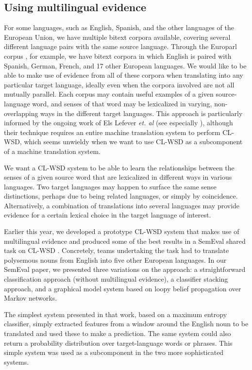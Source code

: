\subsection{Using multilingual evidence}
For some languages, such as English, Spanish, and the other languages of the
European Union, we have multiple bitext corpora available, covering several
different language pairs with the same source language. Through the Europarl
corpus \cite{europarl}, for example, we have bitext corpora in which English is
paired with Spanish, German, French, and 17 other European languages.
We would like to be able to make use of evidence from all of these corpora when
translating into any particular target language, ideally even when the corpora
involved are not all mutually parallel.
Each corpus may contain useful examples of a given source-language word,
and senses of that word may be lexicalized in varying, non-overlapping ways in
the different target languages.
This approach is particularly informed by the ongoing work of Els Lefever
\emph{et. al} (see especially \cite{lefever-hoste-decock:2011:ACL-HLT2011}),
although their technique requires an entire machine translation system to
perform CL-WSD, which seems unwieldy when we want to use CL-WSD as a
subcomponent of a machine translation system.

We want a CL-WSD system to be able to learn the relationships between the
senses of a given source word that are lexicalized in different ways in various
languages.
Two target languages may happen to surface the same sense distinctions, perhaps
due to being related languages, or simply by coincidence.
Alternatively, a combination of translations into several languages may provide
evidence for a certain lexical choice in the target language of interest.

Earlier this year, we developed a prototype CL-WSD system that makes use of
multilingual evidence \cite{rudnick-liu-gasser:2013:SemEval-2013} and produced
some of the best results in a SemEval shared task on CL-WSD \cite{task10}.
Concretely, teams undertaking the task had to translate polysemous nouns from
English into five other European languages.
In our SemEval paper, we presented three variations on the approach:
a straightforward classification approach (without multilingual evidence), a
classifier stacking approach, and a graphical model system based on loopy
belief propagation over Markov networks.

The simplest system presented in that work, based on a maximum entropy
classifier, simply extracted features from a window around the English noun to
be translated and used these to make a prediction. The same system could also
return a probability distribution over target-language words or phrases. This
simple system was used as a subcomponent in the two more sophisticated systems.

